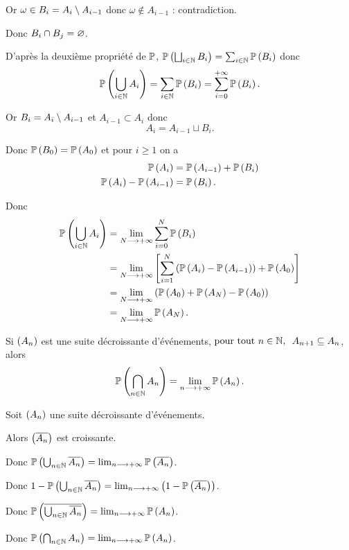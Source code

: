 \begin{dem}
Or \(\omega\in B_i=A_i\setminus A_{i-1}\) donc \(\omega\not\in A_{i-1}\) : contradiction.

Donc \(B_i\cap B_j=\varnothing\).

D'après la deuxième propriété de \(\mathbb{P}\), \(\mathbb{P}\left(\bigsqcup_{i\in\mathbb{N}}B_i\right)=\sum_{i\in\mathbb{N}}\mathbb{P}\left(B_i\right)\) donc \[\mathbb{P}\left(\bigcup_{i\in\mathbb{N}}A_i\right)=\sum_{i\in\mathbb{N}}\mathbb{P}\left(B_i\right)=\sum_{i=0}^{+\infty}\mathbb{P}\left(B_i\right).\]

Or \(B_i=A_i\setminus A_{i-1}\) et \(A_{i-1}\subset A_i\) donc \[A_i=A_{i-1}\sqcup B_i.\]

Donc \(\mathbb{P}\left(B_0\right)=\mathbb{P}\left(A_0\right)\) et pour \(i\geq1\) on a \[\begin{aligned}
\mathbb{P}\left(A_i\right)&=\mathbb{P}\left(A_{i-1}\right)+\mathbb{P}\left(B_i\right) \\
\mathbb{P}\left(A_i\right)-\mathbb{P}\left(A_{i-1}\right)&=\mathbb{P}\left(B_i\right).
\end{aligned}\]

Donc \[\begin{aligned}
\mathbb{P}\left(\bigcup_{i\in\mathbb{N}}A_i\right)&=\lim_{N\longrightarrow+\infty}\sum_{i=0}^N\mathbb{P}\left(B_i\right) \\
&=\lim_{N\longrightarrow+\infty}\left[\sum_{i=1}^N\left(\mathbb{P}\left(A_i\right)-\mathbb{P}\left(A_{i-1}\right)\right)+\mathbb{P}\left(A_0\right)\right] \\
&=\lim_{N\longrightarrow+\infty}\left(\mathbb{P}\left(A_0\right)+\mathbb{P}\left(A_N\right)-\mathbb{P}\left(A_0\right)\right) \\
&=\lim_{N\longrightarrow+\infty}\mathbb{P}\left(A_N\right).
\end{aligned}\]
\end{dem}

\begin{prop}
Si \(\left(A_n\right)\) est une suite décroissante d'événements, \cad \(\quantifs{\tpt n\in\N}A_{n+1}\subset A_n\), alors \[\mathbb{P}\left(\bigcap_{n\in\mathbb{N}}A_n\right)=\lim_{n\longrightarrow+\infty}\mathbb{P}\left(A_n\right).\]
\end{prop}

\begin{dem}
Soit \(\left(A_n\right)\) une suite décroissante d'événements.

Alors \(\left(\overline{A_n}\right)\) est croissante.

Donc \(\mathbb{P}\left(\bigcup_{n\in\mathbb{N}}\overline{A_n}\right)=\lim_{n\longrightarrow+\infty}\mathbb{P}\left(\overline{A_n}\right)\).

Donc \(1-\mathbb{P}\left(\bigcup_{n\in\mathbb{N}}\overline{A_n}\right)=\lim_{n\longrightarrow+\infty}\left(1-\mathbb{P}\left(\overline{A_n}\right)\right)\).

Donc \(\mathbb{P}\left(\overline{\bigcup_{n\in\mathbb{N}}\overline{A_n}}\right)=\lim_{n\longrightarrow+\infty}\mathbb{P}\left(A_n\right)\).

Donc \(\mathbb{P}\left(\bigcap_{n\in\mathbb{N}}A_n\right)=\lim_{n\longrightarrow+\infty}\mathbb{P}\left(A_n\right)\).
\end{dem}

